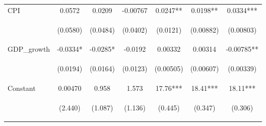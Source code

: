 \documentclass[]{article}
\begin{document}
\begin{center}
\begin{tabular}{lcccccc}
CPI & 0.0572 & 0.0209 & -0.00767 & 0.0247** & 0.0198** & 0.0334*** \\
\vspace{4pt} & \begin{footnotesize}(0.0580)\end{footnotesize} & \begin{footnotesize}(0.0484)\end{footnotesize} & \begin{footnotesize}(0.0402)\end{footnotesize} & \begin{footnotesize}(0.0121)\end{footnotesize} & \begin{footnotesize}(0.00882)\end{footnotesize} & \begin{footnotesize}(0.00803)\end{footnotesize} \\
GDP\_growth & -0.0334* & -0.0285* & -0.0192 & 0.00332 & 0.00314 & -0.00785** \\
\vspace{4pt} & \begin{footnotesize}(0.0194)\end{footnotesize} & \begin{footnotesize}(0.0164)\end{footnotesize} & \begin{footnotesize}(0.0123)\end{footnotesize} & \begin{footnotesize}(0.00505)\end{footnotesize} & \begin{footnotesize}(0.00607)\end{footnotesize} & \begin{footnotesize}(0.00339)\end{footnotesize} \\
Constant & 0.00470 & 0.958 & 1.573 & 17.76*** & 18.41*** & 18.11*** \\
 & \begin{footnotesize}(2.440)\end{footnotesize} & \begin{footnotesize}(1.087)\end{footnotesize} & \begin{footnotesize}(1.136)\end{footnotesize} & \begin{footnotesize}(0.445)\end{footnotesize} & \begin{footnotesize}(0.347)\end{footnotesize} & \begin{footnotesize}(0.306)\end{footnotesize} \\

\end{tabular}
\end{center}
\end{document}
